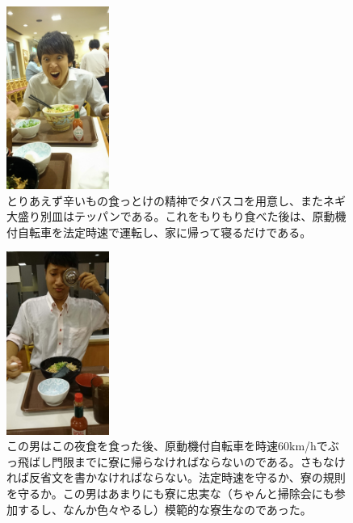 \begin{figure}[htbp]
\centering
\includegraphics[width=0.3\textwidth]{./section/Shokuji/figures/LifeSukiya.jpg}
 \caption{とりあえず辛いもの食っとけの精神でタバスコを用意し、またネギ大盛り別皿はテッパンである。これをもりもり食べた後は、原動機付自転車を法定時速で運転し、家に帰って寝るだけである。}
  \label{fig:one}
\end{figure}
\begin{figure}[htbp]
\centering
\includegraphics[width=0.3\textwidth]{./section/Shokuji/figures/LifeSukiya_2.jpg}
 \caption{この男はこの夜食を食った後、原動機付自転車を時速60km/hでぶっ飛ばし門限までに寮に帰らなければならないのである。さもなければ反省文を書かなければならない。法定時速を守るか、寮の規則を守るか。この男はあまりにも寮に忠実な（ちゃんと掃除会にも参加するし、なんか色々やるし）模範的な寮生なのであった。}
  \label{Fig:Ogawa}
\end{figure}

